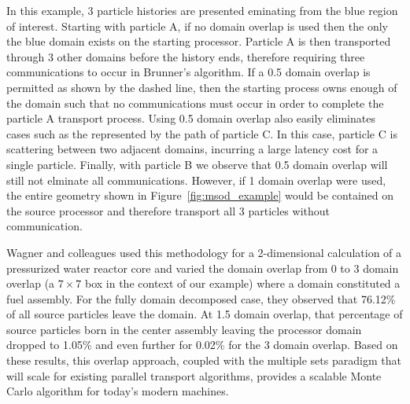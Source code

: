 In this example, 3 particle histories are presented eminating from the
blue region of interest. Starting with particle A, if no domain
overlap is used then the only the blue domain exists on the starting
processor. Particle A is then transported through 3 other domains
before the history ends, therefore requiring three communications to
occur in Brunner's algorithm. If a 0.5 domain overlap is permitted as
shown by the dashed line, then the starting process owns enough of the
domain such that no communications must occur in order to complete the
particle A transport process. Using 0.5 domain overlap also easily
eliminates cases such as the represented by the path of particle C. In
this case, particle C is scattering between two adjacent domains,
incurring a large latency cost for a single particle. Finally, with
particle B we observe that 0.5 domain overlap will still not elminate
all communications. However, if 1 domain overlap were used, the entire
geometry shown in Figure~\ref{fig:msod_example} would be contained on
the source processor and therefore transport all 3 particles without
communication.

Wagner and colleagues used this methodology for a 2-dimensional
calculation of a pressurized water reactor core and varied the domain
overlap from 0 to 3 domain overlap (a $7 \times 7$ box in the context
of our example) where a domain constituted a fuel assembly. For the
fully domain decomposed case, they observed that 76.12\% of all source
particles leave the domain. At 1.5 domain overlap, that percentage of
source particles born in the center assembly leaving the processor
domain dropped to 1.05\% and even further for 0.02\% for the 3 domain
overlap. Based on these results, this overlap approach, coupled with
the multiple sets paradigm that will scale for existing parallel
transport algorithms, provides a scalable Monte Carlo algorithm for
today's modern machines.

